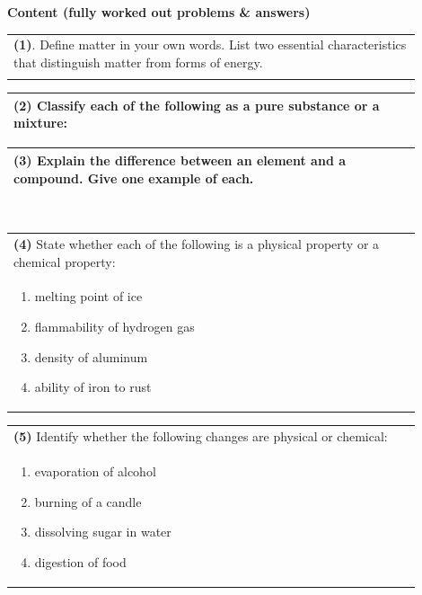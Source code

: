 \documentclass{article}
\begin{document}
\noindent
{\large \textbf{Content (fully worked out problems \& answers)}} \\[0.2em]
\noindent
\begin{tabular}{|p{0.9\linewidth}|}
\hline
\vspace{0.2cm}
\textbf{(1)}. Define matter in your own words. List two essential characteristics that distinguish matter from forms of energy. \\
\\
\hline
\end{tabular}
\newpage
\begin{tabular}{|p{0.9\linewidth}|}
\hline
\vspace{0.2cm}

\textbf{(2)} Classify each of the following as a pure substance or a mixture: \\
\hline
\end{tabular}
\newpage
\begin{tabular}{|p{0.9\linewidth}|}
\hline

\vspace{0.2cm}

\textbf{(3)} Explain the difference between an element and a compound. Give one example of each. \\
\hline
\end{tabular}
\newpage
\\
\begin{tabular}{|p{0.9\linewidth}|}
\hline
\vspace{0.2cm}

\textbf{(4)} State whether each of the following is a physical property or a chemical property: \\
\begin{enumerate}
    \item melting point of ice
    \item flammability of hydrogen gas
    \item density of aluminum
    \item ability of iron to rust
\end{enumerate}
\hline
\end{tabular}
\newpage
\begin{tabular}{|p{0.9\linewidth}|}
\hline
\vspace{0.2cm}

\textbf{(5)} Identify whether the following changes are physical or chemical: \\
\begin{enumerate}
    \item evaporation of alcohol
    \item burning of a candle
    \item dissolving sugar in water
    \item digestion of food
\end{enumerate} \\
\hline
\end{tabular}
\end{document}
